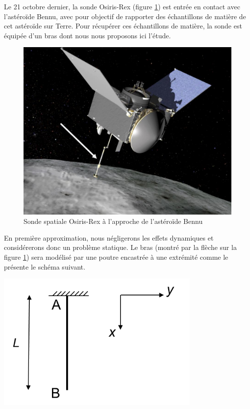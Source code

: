 \documentclass[lecture.tex]{subfiles}
\begin{document}

Le 21 octobre dernier, la sonde Osiris-Rex (figure \ref{figA}) est entrée en contact avec l’astéroïde Bennu, avec pour objectif de rapporter des échantillons de matière de cet astéroïde sur Terre. Pour récupérer ces échantillons de matière, la sonde est équipée d’un bras dont nous nous proposons ici l’étude.

\begin{figure}[h!]
  \centering
  \includegraphics[scale=0.4]{figA0026.png}
  \caption{Sonde spatiale Osiris-Rex à l’approche de l’astéroïde Bennu}
  \label{figA}
\end{figure}

En première approximation, nous négligerons les effets dynamiques et considérerons donc un problème statique. Le bras (montré par la flèche sur la figure \ref{figA}) sera modélisé
par une poutre encastrée à une extrémité comme le présente le schéma suivant.

\begin{center}
  \includegraphics[scale=0.4]{figB0026.png}
\end{center}
\end{document}

